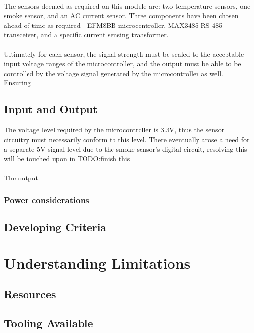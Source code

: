 \documentclass[12pt]{article}
\begin{document}
    \paragraph{}
    The sensors deemed as required on this module are: two temperature sensors, one smoke sensor, and an AC current sensor. Three components have been chosen ahead of time as required - EFM8BB microcontroller, MAX3485 RS-485 transceiver, and a specific current sensing transformer.
    
    \paragraph{}
    Ultimately for each sensor, the signal strength must be scaled to the acceptable input voltage ranges of the microcontroller, and the output must be able to be controlled by the voltage signal generated by the microcontroller as well. Ensuring 

    \subsection{Input and Output} 
    The voltage level required by the microcontroller is 3.3V, thus the sensor circuitry must necessarily conform to this level. There eventually arose a need for a separate 5V signal level due to the smoke sensor's digital circuit, resolving this will be touched upon in TODO:finish this

    \paragraph{}
    The output 

    \subsubsection{Power considerations}

	
  \subsection{Developing Criteria}
	
	\section{Understanding Limitations}
	\subsection{Resources}
	\subsection{Tooling Available}
	
\end{document}
